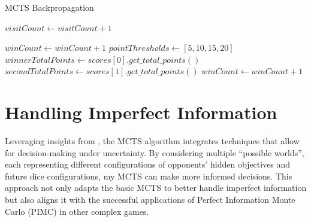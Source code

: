 \begin{algorithm}[H]
    \caption{MCTS Backpropagation}
    \begin{algorithmic}[1]
            \State {}
        \EndIf
        
        \State $visitCount \gets visitCount + 1$
            \State {}
        \EndIf
    \EndFunction
    
        \State $winCount \gets winCount + 1$
        \State $pointThresholds \gets [5,10,15,20]$
        \State $winnerTotalPoints \gets scores[0].get\_total\_points()$
        \State $secondTotalPoints \gets scores[1].get\_total\_points()$
                \State $winCount \gets winCount + 1$
            \EndIf
        \EndFor
    \EndFunction
    \end{algorithmic}
\end{algorithm}

\section{Handling Imperfect Information}

Leveraging insights from  \cite{long2010understanding}, the MCTS algorithm integrates techniques 
that allow for decision-making under uncertainty. By considering multiple ``possible worlds'', each representing different configurations of opponents' hidden 
objectives and future dice configurations, my MCTS can make more informed decisions. This approach not only adapts the basic MCTS to better handle imperfect 
information but also aligns it with the successful applications of Perfect Information Monte Carlo (PIMC) in other complex games.


